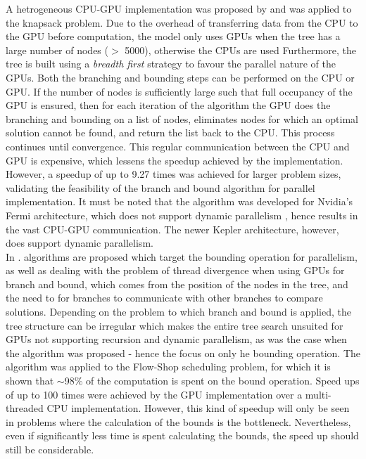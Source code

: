 \documentclass[10pt,twocolumn]{witseiepaper}
\begin{document}
A hetrogeneous CPU-GPU implementation was proposed by \cite{bouk:2012} and was applied to the knapsack 
problem. Due to the overhead of transferring data from the CPU to the GPU before computation, the model only 
uses GPUs when the tree has a large number of nodes ($>$ 5000), otherwise the CPUs are used Furthermore, the 
tree is built using a \textit{breadth first} strategy to favour the parallel nature of the GPUs. Both the
branching and bounding steps can be performed on the CPU or GPU. If the number of nodes is sufficiently large
such that full occupancy of the GPU is ensured, then for each iteration of the algorithm the GPU does the
branching and bounding on a list of nodes, eliminates nodes for which an optimal solution cannot be found, and
return the list back to the CPU. This process continues until convergence. This regular communication between
the CPU and GPU is expensive, which lessens the speedup achieved by the implementation. However, a speedup of 
up to 9.27 times was achieved for larger problem sizes, validating the feasibility of the branch and bound 
algorithm for parallel implementation. It must be noted that the algorithm was developed for Nvidia's Fermi
architecture, which does not support dynamic parallelism \cite{nvidia:2012}, hence results in the vast CPU-GPU 
communication. The newer Kepler architecture, however, does support dynamic parallelism. \\ 
In \cite{melab:2012, chakroun:2012}. algorithms are proposed which target the bounding operation for parallelism,
as well as dealing with the problem of thread divergence when using GPUs for branch and bound, which comes
from the position of the nodes in the tree, and the need to for branches to communicate with other branches to
compare solutions. Depending on the problem to which branch and bound is applied, the tree structure can be
irregular which makes the entire tree search unsuited for GPUs not supporting recursion and dynamic 
parallelism, as was the case when the algorithm was proposed - hence the focus on only he bounding 
operation. The algorithm was applied to the Flow-Shop scheduling problem, for which it is shown that
$\mathit{\sim}$98$\%$ of the computation is spent on the bound operation. Speed ups of up to
100 times were achieved by the GPU implementation over a multi-threaded CPU implementation. However, this 
kind of speedup will only be seen in problems where the calculation of the bounds is the bottleneck. 
Nevertheless, even if significantly less time is spent calculating the bounds, the speed up should still be
considerable.\\
\end{document}
